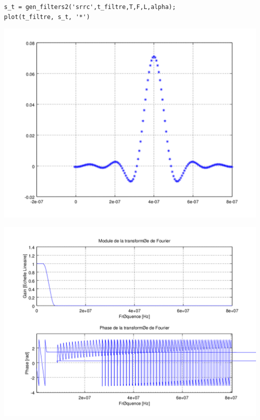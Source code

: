 \documentclass{acm_proc_article-sp}
\begin{document}
\begin{center}
\begin{lstlisting}
s_t = gen_filters2('srrc',t_filtre,T,F,L,alpha);
plot(t_filtre, s_t, '*')
\end{lstlisting}

\includegraphics[scale=0.45]{SRRC_3.png}

\includegraphics[scale=0.45]{SRRC_rep_3.png}


\end{center}
\end{document}
